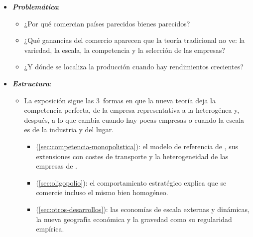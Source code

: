 \documentclass[11pt]{article}
\begin{document}
\begin{itemize}
\item \textbf{\emph{Problemática}}:
  \begin{itemize}
  \item ¿Por qué comercian países parecidos bienes parecidos?
  \item ¿Qué ganancias del comercio aparecen que la teoría tradicional no ve: la variedad, la escala, la competencia y la selección de las empresas?
  \item ¿Y dónde se localiza la producción cuando hay rendimientos crecientes?
  \end{itemize}

\item \textbf{\emph{Estructura}}:
  \begin{itemize}
  \item La exposición sigue las 3~formas en que la nueva teoría deja la competencia perfecta, de la empresa representativa a la heterogénea y, después, a lo que cambia cuando hay pocas empresas o cuando la escala es de la industria y del lugar.
    \begin{itemize}
    \item {} (\ref{sec:competencia-monopolistica}): el modelo de referencia de , sus extensiones con costes de transporte y la heterogeneidad de las empresas de .
    \item {} (\ref{sec:oligopolio}): el comportamiento estratégico explica que se comercie incluso el mismo bien homogéneo.
    \item {} (\ref{sec:otros-desarrollos}): las economías de escala externas y dinámicas, la nueva geografía económica y la gravedad como su regularidad empírica.
    \end{itemize}
  \end{itemize}
\end{itemize}
\end{document}
